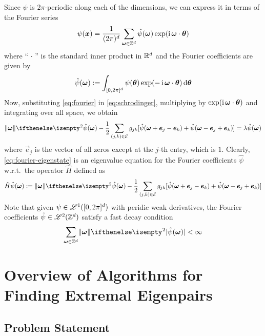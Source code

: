 \documentclass{amsart}
\begin{document}
Since $\psi$ is $2\pi$-periodic along each of the dimensions, we can express it
in terms of the Fourier series
\begin{equation}
  \label{eq:fourier}
  \psi(\bm{x}) = \frac{1}{(2 \pi)^d} \sum_{\bm{\omega} \in \mathbb{Z}^d}
  \hat{\psi}(\bm{\omega}) \exp(\operatorname{i} \bm{\omega} \cdot \bm{\theta})
\end{equation}
where ``$\,\cdot\,$'' is the standard inner product in $\mathbb{R}^d$ and the Fourier
coefficients are given by
\begin{equation}
  \hat{\psi}(\bm{\omega}) := \int_{[0, 2\pi]^d} \psi(\bm{\theta}) \exp(-\operatorname{i}
  \bm{\omega} \cdot \bm{\theta}) \operatorname{d}\!{\bm{\theta}}
\end{equation}
Now, substituting \eqref{eq:fourier} in \eqref{eq:schrodinger}, multiplying by
$\exp(\operatorname{i} \bm{\omega} \cdot \bm{\theta})$ and integrating over all space, we
obtain
\begin{equation}
  \label{eq:fourier-eigenstate}
  \Norm{\Vec{\omega}}^2 \hat{\psi}(\Vec{\omega}) - \frac{1}{2} \sum_{(j, k) \in
  \CE} g_{jk} [\hat{\psi}(\Vec{\omega} + \Vec{e}_j - \Vec{e}_k) +
  \hat{\psi}(\Vec{\omega} - \Vec{e}_j + \Vec{e}_k)] = \lambda
  \hat{\psi}(\Vec{\omega})
\end{equation}
where $\Vec{e}_j$ is the vector of all zeros except at the $j$-th entry, which
is $1$. Clearly, \eqref{eq:fourier-eigenstate} is an eigenvalue equation for
the Fourier coefficients $\hat{\psi}$ w.r.t.\ the operator $\hat{H}$ defined as
\begin{equation}
  \hat{H} \hat{\psi}(\Vec{\omega}) := \Norm{\Vec{\omega}}^2
  \hat{\psi}(\Vec{\omega}) - \frac{1}{2} \sum_{(j, k) \in \CE} g_{jk}
  [\hat{\psi}(\Vec{\omega} + \Vec{e}_j - \Vec{e}_k) + \hat{\psi}(\Vec{\omega} -
  \Vec{e}_j + \Vec{e}_k)]
\end{equation}
Note that given $\psi \in \mathscr{L}^1([0, 2\pi]^d)$ with peridic weak derivatives,
the Fourier coefficients $\hat{\psi} \in \mathscr{L}^2(\mathbb{Z}^d)$ satisfy a fast decay
condition
\begin{equation}
  \sum_{\Vec{\omega} \in \DZ^d} \Norm{\Vec{\omega}}^2
  \Abs{\hat{\psi}(\Vec{\omega})} < \infty
\end{equation}

\section{Overview of Algorithms for Finding Extremal Eigenpairs}

\subsection{Problem Statement}
\end{document}
